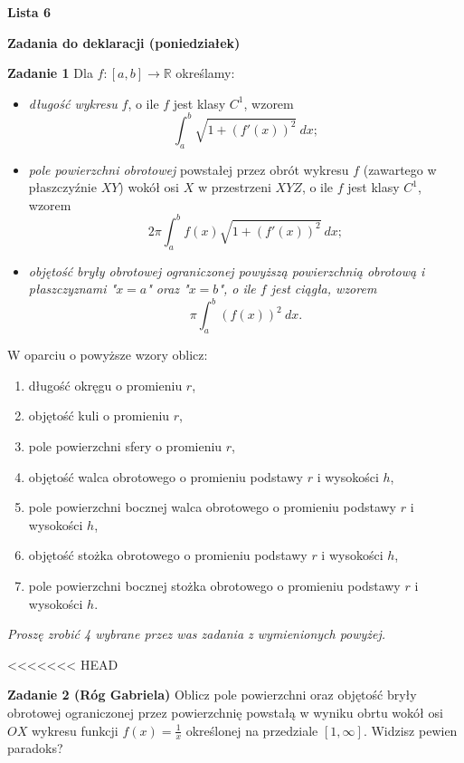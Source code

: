 \documentclass[a4paper,11pt]{article}
\begin{document}
\begin{center}
  {\large\textbf{Lista 6}}
\end{center}

\hrulefill
\begin{center}
    \textbf{Zadania do deklaracji (poniedziałek)}
\end{center}

\bigskip

\textbf{Zadanie 1} Dla $f:[a,b] \to \mathbb{R}$ określamy:

\begin{itemize}
    \item \textit{długość wykresu} $f$, o ile $f$ jest klasy $C^1$, wzorem 
    $$\int_a^b \sqrt{1+(f'(x))^2} ~dx;$$
    \item \textit{pole powierzchni obrotowej} powstałej przez obrót wykresu $f$ 
    (zawartego w płaszczyźnie $XY$) wokół osi $X$ w przestrzeni $XYZ$, 
    o ile $f$ jest klasy $C^1$, wzorem
    $$2\pi \int_a^b f(x) \sqrt{1+(f'(x))^2}~dx;$$
    \item \textit{objętość bryły obrotowej ograniczonej powyższą powierzchnią 
    obrotową i płaszczyznami "$x=a$" oraz "$x=b$", o ile $f$ jest ciągła, wzorem}
    $$\pi \int_a^b (f(x))^2 ~dx.$$
\end{itemize}

W oparciu o powyższe wzory oblicz:
\begin{enumerate}
    \item  długość okręgu o promieniu $r$,
    \item objętość kuli o promieniu $r$,
    \item pole powierzchni sfery o promieniu $r$,
    \item  objętość walca obrotowego o promieniu podstawy $r$ i wysokości $h$,
    \item pole powierzchni bocznej walca obrotowego o promieniu podstawy $r$ i wysokości $h$,
    \item objętość stożka obrotowego o promieniu podstawy $r$ i wysokości $h$,
    \item pole powierzchni bocznej stożka obrotowego o promieniu podstawy $r$ i wysokości $h$.
\end{enumerate}

\textit{Proszę zrobić 4 wybrane przez was zadania z wymienionych powyżej.} 

\bigskip

<<<<<<< HEAD
\hrulefill

\textbf{Zadanie 2 (Róg Gabriela)} Oblicz pole powierzchni oraz objętość
bryły obrotowej ograniczonej przez powierzchnię powstałą w wyniku obrtu
wokół osi $OX$ wykresu funkcji $f(x) = \frac{1}{x}$ określonej na
przedziale $[1,\infty]$. Widzisz pewien paradoks?
\end{document}
